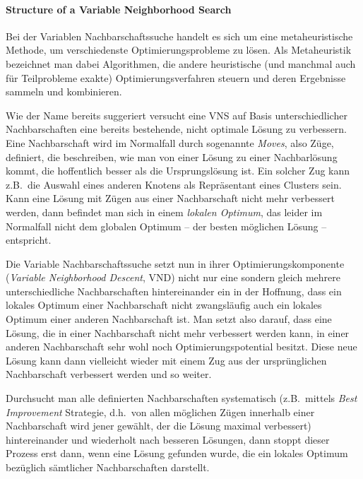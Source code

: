 \documentclass[paper=a4,fontsize=12pt]{scrartcl}
\begin{document}
\paragraph{Structure of a Variable Neighborhood Search}{
Bei der Variablen Nachbarschaftssuche handelt es sich um eine metaheuristische Methode, um verschiedenste Optimierungsprobleme zu lösen. Als Metaheuristik bezeichnet man dabei Algorithmen, die andere heuristische (und manchmal auch für Teilprobleme exakte) Optimierungsverfahren steuern und deren Ergebnisse sammeln und kombinieren.

Wie der Name bereits suggeriert versucht eine VNS auf Basis unterschiedlicher Nachbarschaften eine bereits bestehende, nicht optimale Lösung zu verbessern. Eine Nachbarschaft wird im Normalfall durch sogenannte \emph{Moves}, also Züge, definiert, die be\-schrei\-ben, wie man von einer Lösung zu einer Nachbarlösung kommt, die hoffentlich besser als die Ursprungslösung ist. Ein solcher Zug kann z.B.\ die Auswahl eines anderen Knotens als Repräsentant eines Clusters sein. Kann eine Lösung mit Zügen aus einer Nachbarschaft nicht mehr verbessert werden, dann befindet man sich in einem \emph{lokalen Optimum}, das leider im Normalfall nicht dem globalen Optimum -- der besten möglichen Lösung -- entspricht.

Die Variable Nachbarschaftssuche setzt nun in ihrer Optimierungskomponente (\emph{Variable Neighborhood Descent}, VND) nicht nur eine sondern gleich mehrere unterschiedliche Nachbarschaften hintereinander ein in der Hoffnung, dass ein lokales Optimum einer Nachbarschaft nicht zwangsläufig auch ein lokales Optimum einer anderen Nachbarschaft ist. Man setzt also darauf, dass eine Lösung, die in einer Nachbarschaft nicht mehr verbessert werden kann, in einer anderen Nachbarschaft sehr wohl noch Optimierungspotential besitzt. Diese neue Lösung kann dann vielleicht wieder mit einem Zug aus der ursprünglichen Nachbarschaft verbessert werden und so weiter.

Durchsucht man alle definierten Nachbarschaften systematisch (z.B.\ mittels \emph{Best Improvement} Strategie, d.h.\ von allen möglichen Zügen innerhalb einer Nachbarschaft wird jener gewählt, der die Lösung maximal verbessert) hintereinander und wiederholt nach besseren Lösungen, dann stoppt dieser Prozess erst dann, wenn eine Lösung gefunden wurde, die ein lokales Optimum bezüglich sämtlicher Nachbarschaften darstellt.

}
\end{document}
